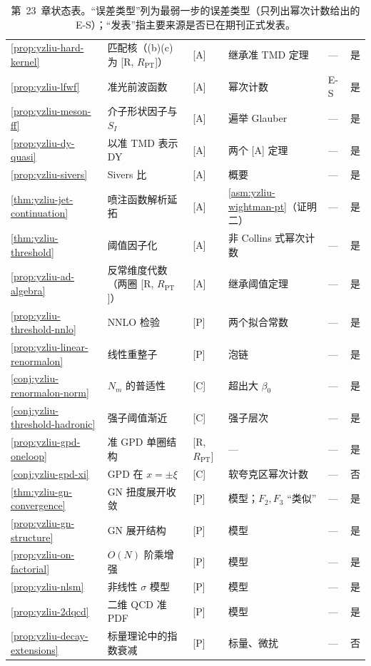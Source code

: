 \begin{table}[htbp]
\begin{tabular}{@{}p{2.25cm}p{4.2cm}p{1.75cm}p{3.2cm}p{1.0cm}p{0.95cm}@{}}
\cref{prop:yzliu-hard-kernel} & 匹配核（(b)(c) 为 [R, $R_{\mathrm{PT}}$]） & [A] & 继承准 TMD 定理 & — & 是 \\
\cref{prop:yzliu-lfwf} & 准光前波函数 & [A] & 幂次计数 & E-S & 是 \\
\cref{prop:yzliu-meson-ff} & 介子形状因子与 $S_I$ & [A] & 遍举 Glauber & — & 是 \\
\cref{prop:yzliu-dy-quasi} & 以准 TMD 表示 DY & [A] & 两个 [A] 定理 & — & 是 \\
\cref{prop:yzliu-sivers} & Sivers 比 & [A] & 概要 & — & 是 \\
\cref{thm:yzliu-jet-continuation} & 喷注函数解析延拓 & [A] & \cref{asm:yzliu-wightman-pt}（证明二） & — & 是 \\
\cref{thm:yzliu-threshold} & 阈值因子化 & [A] & 非 Collins 式幂次计数 & — & 是 \\
\cref{prop:yzliu-ad-algebra} & 反常维度代数（两圈 [R, $R_{\mathrm{PT}}$]） & [A] & 继承阈值定理 & — & 是 \\
\cref{prop:yzliu-threshold-nnlo} & NNLO 检验 & [P] & 两个拟合常数 & — & 是 \\
\cref{prop:yzliu-linear-renormalon} & 线性重整子 & [P] & 泡链 & — & 是 \\
\cref{conj:yzliu-renormalon-norm} & $N_m$ 的普适性 & [C] & 超出大 $\beta_0$ & — & 是 \\
\cref{conj:yzliu-threshold-hadronic} & 强子阈值渐近 & [C] & 强子层次 & — & 是 \\
\cref{prop:yzliu-gpd-oneloop} & 准 GPD 单圈结构 & [R, $R_{\mathrm{PT}}$] & — & — & 是 \\
\cref{conj:yzliu-gpd-xi} & GPD 在 $x=\pm\xi$ & [C] & 软夸克区幂次计数 & — & 否 \\
\cref{thm:yzliu-gn-convergence} & GN 扭度展开收敛 & [P] & 模型；$F_2,F_3$ “类似” & — & 是 \\
\cref{prop:yzliu-gn-structure} & GN 展开结构 & [P] & 模型 & — & 是 \\
\cref{prop:yzliu-on-factorial} & $O(N)$ 阶乘增强 & [P] & 模型 & — & 是 \\
\cref{prop:yzliu-nlsm} & 非线性 $\sigma$ 模型 & [P] & 模型 & — & 是 \\
\cref{prop:yzliu-2dqcd} & 二维 QCD 准 PDF & [P] & 模型 & — & 是 \\
\cref{prop:yzliu-decay-extensions} & 标量理论中的指数衰减 & [P] & 标量、微扰 & — & 否 \\
\bottomrule
\end{tabular}
\caption{第~23~章状态表。“误差类型”列为最弱一步的误差类型（只列出幂次计数给出的 E-S）；“发表”指主要来源是否已在期刊正式发表。}
\label{tab:yzliu-status}
\end{table}

